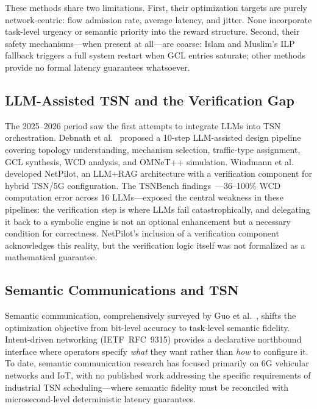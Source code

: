 \documentclass[conference]{IEEEtran}
\begin{document}
These methods share two limitations. First, their optimization targets are purely network-centric: flow admission rate, average latency, and jitter. None incorporate task-level urgency or semantic priority into the reward structure. Second, their safety mechanisms---when present at all---are coarse: Islam and Muslim's ILP fallback triggers a full system restart when GCL entries saturate; other methods provide no formal latency guarantees whatsoever.

\subsection{LLM-Assisted TSN and the Verification Gap}

The 2025--2026 period saw the first attempts to integrate LLMs into TSN orchestration. Debnath et al.~\cite{debnath2025llmtsn} proposed a 10-step LLM-assisted design pipeline covering topology understanding, mechanism selection, traffic-type assignment, GCL synthesis, WCD analysis, and OMNeT++ simulation. Windmann et al.~\cite{windmann2025netpilot} developed NetPilot, an LLM+RAG architecture with a verification component for hybrid TSN/5G configuration. The TSNBench findings~\cite{debnath2026tsnbench}---36--100\% WCD computation error across 16 LLMs---exposed the central weakness in these pipelines: the verification step is where LLMs fail catastrophically, and delegating it back to a symbolic engine is not an optional enhancement but a necessary condition for correctness. NetPilot's inclusion of a verification component acknowledges this reality, but the verification logic itself was not formalized as a mathematical guarantee.

\subsection{Semantic Communications and TSN}

Semantic communication, comprehensively surveyed by Guo et al.~\cite{guo2024semanticcom}, shifts the optimization objective from bit-level accuracy to task-level semantic fidelity. Intent-driven networking (IETF~RFC~9315) provides a declarative northbound interface where operators specify \textit{what} they want rather than \textit{how} to configure it. To date, semantic communication research has focused primarily on 6G vehicular networks and IoT, with no published work addressing the specific requirements of industrial TSN scheduling---where semantic fidelity must be reconciled with microsecond-level deterministic latency guarantees.
\end{document}
